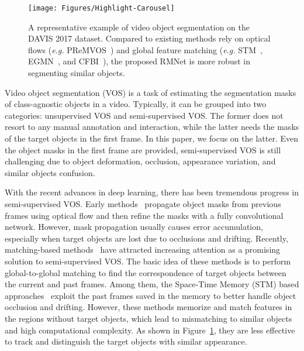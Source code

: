 \documentclass[final]{cvpr}
\begin{document}
\begin{figure}[!t]
  \resizebox{\linewidth}{!} {
    \texttt{[image: Figures/Highlight-Carousel]}
  }
  \caption{A representative example of video object segmentation on the DAVIS 2017 dataset. Compared to existing methods rely on optical flows ({\it e.g.} PReMVOS~\cite{DBLP:conf/accv/LuitenVL18}) and global feature matching ({\it e.g.} STM~\cite{DBLP:conf/iccv/OhLXK19}, EGMN~\cite{DBLP:conf/eccv/LuWDZSG20}, and CFBI~\cite{DBLP:conf/eccv/YangWY20}), the proposed RMNet is more robust in segmenting similar objects.}
  \label{fig:highlight}
  \vspace{-3 mm}
\end{figure}

Video object segmentation (VOS) is a task of estimating the segmentation masks of class-agnostic objects in a video.
Typically, it can be grouped into two categories: unsupervised VOS and semi-supervised VOS.
The former does not resort to any manual annotation and interaction, while the latter needs the masks of the target objects in the first frame.
In this paper, we focus on the latter.
Even the object masks in the first frame are provided, semi-supervised VOS is still challenging due to object deformation, occlusion, appearance variation, and similar objects confusion.

With the recent advances in deep learning, there has been tremendous progress in semi-supervised VOS.
Early methods~\cite{DBLP:conf/nips/HuHS17,DBLP:conf/accv/LuitenVL18,DBLP:conf/cvpr/PerazziKBSS17} propagate object masks from previous frames using optical flow and then refine the masks with a fully convolutional network.
However, mask propagation usually causes error accumulation, especially when target objects are lost due to occlusions and drifting.
Recently, matching-based methods~\cite{DBLP:conf/cvpr/ChenPMG18,DBLP:conf/eccv/LuWDZSG20,DBLP:conf/iccv/OhLXK19, DBLP:conf/eccv/SeongHK20,DBLP:conf/cvpr/VoigtlaenderCSA19,DBLP:conf/eccv/YangWY20} have attracted increasing attention as a promising solution to semi-supervised VOS.
The basic idea of these methods is to perform global-to-global matching to find the correspondence of target objects between the current and past frames.
Among them, the Space-Time Memory (STM) based approaches~\cite{DBLP:conf/eccv/LuWDZSG20,DBLP:conf/iccv/OhLXK19, DBLP:conf/eccv/SeongHK20} exploit the past frames saved in the memory to better handle object occlusion and drifting.
However, these methods memorize and match features in the regions without target objects, which lead to mismatching to similar objects and high computational complexity.
As shown in Figure~\ref{fig:highlight}, they are less effective to track and distinguish the target objects with similar appearance.
\end{document}
